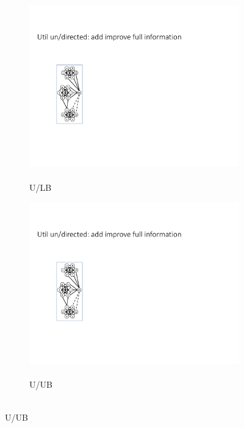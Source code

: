 \documentclass{article}
\begin{document}
\begin{figure}[t]
\begin{subfigure}{0.1\textwidth}
            \label{fig:Util_dir_remove}
        \end{subfigure}
        \hfill
        \begin{subfigure}{0.1\textwidth}
        \centering
            \includegraphics[page=6,width=\textwidth]{Graphs/graphs.pdf}
            \caption{\\U/LB}
            \label{fig:Util_remove_LB}
        \end{subfigure}    
        \hfill
        \begin{subfigure}{0.1\textwidth}
        \centering
            \includegraphics[page=9,width=\textwidth]{Graphs/graphs.pdf}
            \caption{\\U/UB}

\end{subfigure}
\end{figure}
\end{document}
